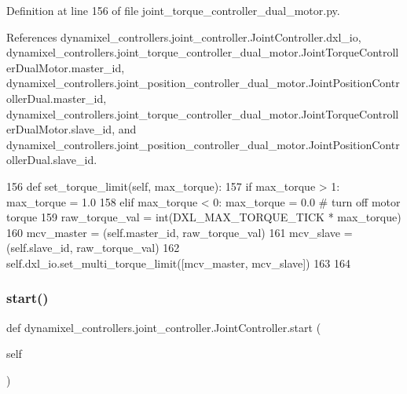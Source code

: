 Definition at line 156 of file joint\+\_\+torque\+\_\+controller\+\_\+dual\+\_\+motor.\+py.



References dynamixel\+\_\+controllers.\+joint\+\_\+controller.\+Joint\+Controller.\+dxl\+\_\+io, dynamixel\+\_\+controllers.\+joint\+\_\+torque\+\_\+controller\+\_\+dual\+\_\+motor.\+Joint\+Torque\+Controller\+Dual\+Motor.\+master\+\_\+id, dynamixel\+\_\+controllers.\+joint\+\_\+position\+\_\+controller\+\_\+dual\+\_\+motor.\+Joint\+Position\+Controller\+Dual.\+master\+\_\+id, dynamixel\+\_\+controllers.\+joint\+\_\+torque\+\_\+controller\+\_\+dual\+\_\+motor.\+Joint\+Torque\+Controller\+Dual\+Motor.\+slave\+\_\+id, and dynamixel\+\_\+controllers.\+joint\+\_\+position\+\_\+controller\+\_\+dual\+\_\+motor.\+Joint\+Position\+Controller\+Dual.\+slave\+\_\+id.


\begin{DoxyCode}
156     \textcolor{keyword}{def }set\_torque\_limit(self, max\_torque):
157         \textcolor{keywordflow}{if} max\_torque > 1: max\_torque = 1.0
158         \textcolor{keywordflow}{elif} max\_torque < 0: max\_torque = 0.0     \textcolor{comment}{# turn off motor torque}
159         raw\_torque\_val = int(DXL\_MAX\_TORQUE\_TICK * max\_torque)
160         mcv\_master = (self.master\_id, raw\_torque\_val)
161         mcv\_slave = (self.slave\_id, raw\_torque\_val)
162         self.dxl\_io.set\_multi\_torque\_limit([mcv\_master, mcv\_slave])
163 
164 
\end{DoxyCode}
\mbox{\label{classdynamixel__controllers_1_1joint__controller_1_1_joint_controller_a8da16a8b801f868a4de7c68d6adc851f}} 
\subsubsection{\texorpdfstring{start()}{start()}}
{\footnotesize\ttfamily def dynamixel\+\_\+controllers.\+joint\+\_\+controller.\+Joint\+Controller.\+start (\begin{DoxyParamCaption}\item[{}]{self }\end{DoxyParamCaption})\hspace{0.3cm}{\ttfamily [inherited]}}



